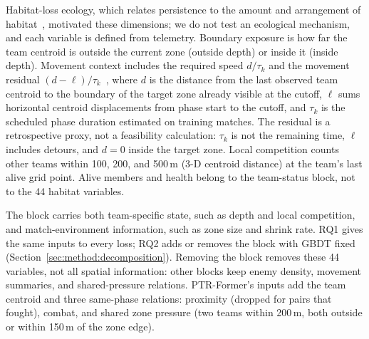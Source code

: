 \documentclass[sigconf,anonymous]{acmart}
\begin{document}
Habitat-loss ecology, which relates persistence to the amount and arrangement of habitat~\cite{Fahrig03}, motivated these dimensions; we do not test an ecological mechanism, and each variable is defined from telemetry. Boundary exposure is how far the team centroid is outside the current zone (outside depth) or inside it (inside depth). Movement context includes the required speed $d/\tau_k$ and the movement residual $(d-\ell)/\tau_k$~\cite{Nathan08}, where $d$ is the distance from the last observed team centroid to the boundary of the target zone already visible at the cutoff, $\ell$ sums horizontal centroid displacements from phase start to the cutoff, and $\tau_k$ is the scheduled phase duration estimated on training matches. The residual is a retrospective proxy, not a feasibility calculation: $\tau_k$ is not the remaining time, $\ell$ includes detours, and $d=0$ inside the target zone. Local competition counts other teams within 100, 200, and 500\,m (3-D centroid distance) at the team's last alive grid point. Alive members and health belong to the team-status block, not to the 44 habitat variables.

The block carries both team-specific state, such as depth and local competition, and match-environment information, such as zone size and shrink rate. RQ1 gives the same inputs to every loss; RQ2 adds or removes the block with GBDT fixed (Section~\ref{sec:method:decomposition}). Removing the block removes these 44 variables, not all spatial information: other blocks keep enemy density, movement summaries, and shared-pressure relations. PTR-Former's inputs add the team centroid and three same-phase relations: proximity (dropped for pairs that fought), combat, and shared zone pressure (two teams within 200\,m, both outside or within 150\,m of the zone edge).
\end{document}

